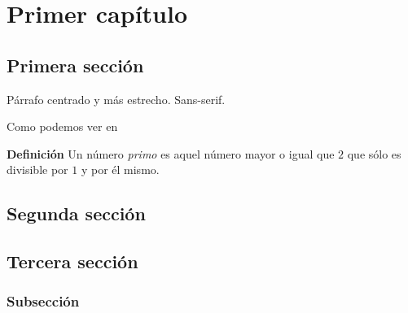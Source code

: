 \chapter{Primer capítulo}

\section{Primera sección}

\begin{center}
\parbox{0.8\linewidth}{ \sffamily
Párrafo centrado y más estrecho. Sans-serif. \lipsum[75]
}
\end{center}

Como podemos ver en \cite{Euler1982}

\textbf{Definición}
Un número \emph{primo} es aquel número mayor o igual que $2$ que sólo es divisible por $1$ y por él mismo.

\lipsum[1] 

\section{Segunda sección}
\lipsum[1]
\lipsum[3]

\section{Tercera sección}

\lipsum[1-2] \cite{MR2009}

\subsection{Subsección}

\lipsum[1]